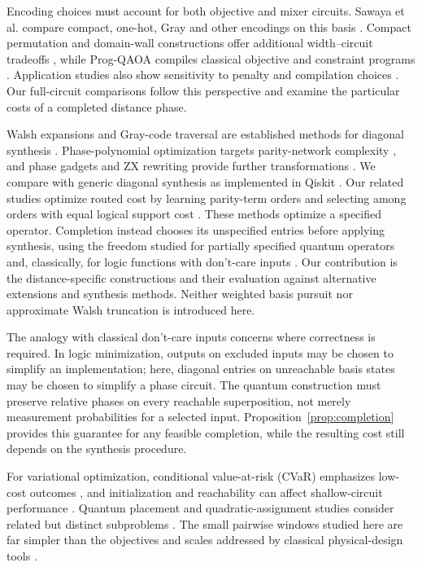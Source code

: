 \documentclass[manuscript,screen,review]{acmart}
\begin{document}
Encoding choices must account for both objective and mixer circuits.
Sawaya et al. compare compact, one-hot, Gray and other encodings on this
basis \cite{sawaya2023encoding}. Compact permutation and domain-wall
constructions offer additional width--circuit tradeoffs
\cite{glos2022spaceefficient,chancellor2019domainwall}, while Prog-QAOA
compiles classical objective and constraint programs \cite{bako2025progqaoa}.
Application studies also show sensitivity to penalty and compilation choices
\cite{schmidbauer2025path}. Our full-circuit comparisons follow this
perspective and examine the particular costs of a completed distance phase.

Walsh expansions and Gray-code traversal are established methods for diagonal
synthesis \cite{welch2014diagonal}. Phase-polynomial optimization targets
parity-network complexity \cite{amy2018cnotphase,nam2018optimization}, and
phase gadgets and ZX rewriting provide further transformations
\cite{cowtan2020phasegadgets,kissinger2020pyzx}. We compare with generic
diagonal synthesis as implemented in Qiskit
\cite{shende2006synthesis,javadiabhari2024qiskit}. Our related studies optimize
routed cost by learning parity-term orders \cite{friedewald2026shielded}
and selecting among orders with equal logical support cost
\cite{friedewald2026plateau}. These methods optimize a specified operator. Completion instead chooses its unspecified entries
before applying synthesis, using the freedom studied for partially specified
quantum operators \cite{shende2005incomplete} and, classically, for logic
functions with don't-care inputs \cite{brayton1984logic}. Our contribution is
the distance-specific constructions and their evaluation against alternative
extensions and synthesis methods. Neither weighted basis pursuit
\cite{chen1998basispursuit} nor approximate Walsh truncation is introduced here.

The analogy with classical don't-care inputs concerns where correctness is
required. In logic minimization, outputs on excluded inputs may be chosen
to simplify an implementation; here, diagonal entries on unreachable basis
states may be chosen to simplify a phase circuit. The quantum construction
must preserve relative phases on every reachable superposition, not merely
measurement probabilities for a selected input. Proposition~\ref{prop:completion}
provides this guarantee for any feasible completion, while the resulting
cost still depends on the synthesis procedure.

For variational optimization, conditional value-at-risk (CVaR) emphasizes low-cost outcomes
\cite{barkoutsos2020cvar}, and initialization and reachability can affect
shallow-circuit performance \cite{egger2021warmstart,akshay2020reachability}.
Quantum placement and quadratic-assignment studies consider related but
distinct subproblems
\cite{turtletaub2020quantumplacement,gerlach2024fpgaplacement,khumalo2022qap}.
The small pairwise windows studied here are far simpler than the objectives
and scales addressed by classical physical-design tools
\cite{kahng2011physicaldesign,lu2015eplace,cheng2019replace,lin2021dreamplace}.
\end{document}
